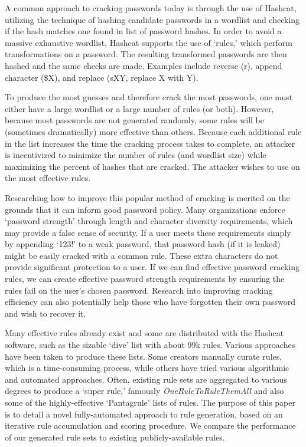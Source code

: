 \documentclass[letterpaper,twocolumn,10pt]{article}
\begin{document}
A common approach to cracking passwords today is through the use of Hashcat,
utilizing the technique of hashing candidate passwords in a wordlist and
checking if the hash matches one found in list of password hashes. In order to avoid a massive exhaustive
wordlist, Hashcat supports the use of `rules,' which perform
transformations on a password. The resulting transformed passwords are then hashed and the same
checks are made. Examples include reverse (r), append character (\$X), and
replace (sXY, replace X with Y).\cite{hashcat}


To produce the most guesses and therefore crack the most passwords, one must either have a large wordlist or a large number of rules (or both). However, because
most passwords are not generated randomly, some rules will be
(sometimes dramatically) more effective than others. Because each additional
rule in the list increases the time the cracking process takes to complete, an
attacker is incentivized to minimize the number of rules (and wordlist size) while maximizing the percent of hashes that are cracked. The attacker wishes to use on the most effective rules.

Researching how to improve this popular method of cracking
is merited on the grounds that it can inform good password policy.
Many organizations enforce `password strength' through
length and character diversity requirements, which may provide a false sense
of security. If a user meets these requirements simply by appending `123!' to a
weak password, that password hash (if it is leaked) might be easily cracked with
a common rule. These extra characters do not provide significant protection to a user.
If we can find effective password cracking rules, we can create effective password
strength requirements by ensuring the rules fail on the user's chosen password.
Research into improving cracking efficiency can also potentially help those
who have forgotten their own password and wish to recover it.


Many effective rules already exist and some are distributed with the Hashcat
software, such as the sizable `dive' list with about 99k rules. Various
approaches have been taken to produce these lists. Some creators manually
curate rules, which is a time-consuming process, while others have tried
various algorithmic and automated approaches. Often, existing rule sets are
aggregated to various degrees to produce a `super rule,' famously
\textit{OneRuleToRuleThemAll} and also some of the highly-effective
`Pantagrule' lists of rules\cite{ortrta,pantagrule}. The purpose of this paper
is to detail a novel fully-automated approach to rule generation, based on an
iterative rule accumulation and scoring procedure. We compare the performance of
our generated rule sets to existing publicly-available rules.
\end{document}
